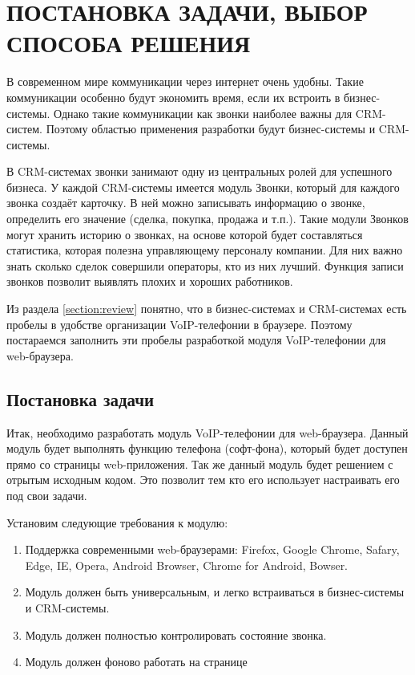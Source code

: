 \chapter{ПОСТАНОВКА ЗАДАЧИ, ВЫБОР СПОСОБА РЕШЕНИЯ}

В современном мире коммуникации через интернет очень удобны. Такие коммуникации особенно будут экономить время, если их встроить в бизнес-системы. Однако такие коммуникации как звонки наиболее важны для CRM-систем. Поэтому областью применения разработки будут бизнес-системы и CRM-системы.

В CRM-системах звонки занимают одну из центральных ролей для успешного бизнеса. У каждой CRM-системы имеется модуль Звонки, который для каждого звонка создаёт карточку. В ней можно записывать информацию о звонке, определить его значение (сделка, покупка, продажа и т.п.). Такие модули Звонков могут хранить историю о звонках, на основе которой будет составляться статистика, которая полезна управляющему персоналу компании. Для них важно знать сколько сделок совершили операторы, кто из них лучший. Функция записи звонков позволит выявлять плохих и хороших работников.

Из раздела \ref{section:review} понятно, что в бизнес-системах и CRM-системах есть пробелы в удобстве организации VoIP-телефонии в браузере. Поэтому постараемся заполнить эти пробелы разработкой модуля VoIP-телефонии для web-браузера.

\section{Постановка задачи}

Итак, необходимо разработать модуль VoIP-телефонии для web-браузера. Данный модуль будет выполнять функцию телефона (софт-фона), который будет доступен прямо со страницы web-приложения. Так же данный модуль будет решением с отрытым исходным кодом. Это позволит тем кто его использует настраивать его под свои задачи.

Установим следующие требования к модулю:
\begin{enumerate}
\item Поддержка современными web-браузерами: Firefox, Google Chrome, Safary, Edge, IE, Opera, Android Browser, Chrome for Android, Bowser.
\item Модуль должен быть универсальным, и легко встраиваться в бизнес-системы и CRM-системы.
\item Модуль должен полностью контролировать состояние звонка.
\item Модуль должен фоново работать на странице
\end{enumerate}


